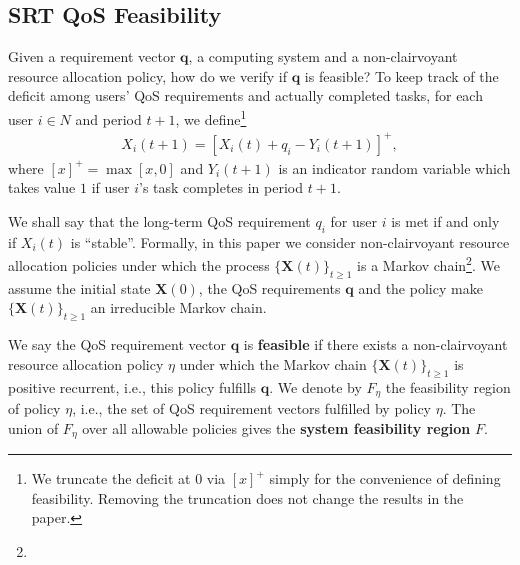 \documentclass[prodmode,acmtompecs]{acmsmall}
\newcommand{\reqvec}{\mathbf{q}}
\newcommand{\reqscalar}{q}
\newcommand{\feasibilityRegion}{F}
\newcommand{\fullUserSet}{N}
\newcommand{\myComments}[1]{}
\newif\ifinfocom
\newif\iftompecs
\newcommand{\infocomStart}{\ifinfocom \myComments{Infocom: }}
\newcommand{\tompecsStart}{\iftompecs \myComments{TOMPECS version: }}
\newcommand{\commentEnd}{\myComments{End}}
\begin{document}
\subsection{SRT QoS Feasibility}
Given a requirement vector $\reqvec$, a computing system and a non-clairvoyant resource allocation policy, how do we verify if $\reqvec$ is feasible?  
To keep track of the deficit among users' QoS requirements and actually completed tasks, for each user $i\in \fullUserSet$ and period $t+1$, we define\footnote{We truncate the deficit at $0$ via $[x]^+$ simply for the convenience of defining feasibility. Removing the truncation does not change the results in the paper. }
\begin{align}
\label{align_deficit}
X_i(t+1) = [X_i(t) + q_i - Y_i(t+1)]^+,
\end{align}
where $[x]^+ = \max[x, 0]$ and $Y_i(t+1)$ is an indicator random variable which takes value $1$ if user $i$'s task completes in period $t+1$. 
\infocomStart
The deficit vector $\mathbf{X}(t) = (X_1(t), X_2(t), \cdots, X_n(t))$ is a summary of the history of events up to period $t$. 
\commentEnd\fi
\tompecsStart
We let $\mathbf{X}(t) = (X_1(t), X_2(t), \cdots, X_n(t))$ denote the deficit vector. $\mathbf{X}(t)$ is a summary of the history of events up to period $t$. 
\commentEnd\fi

We shall say that the long-term QoS requirement $\reqscalar_i$ for user $i$ is met if and only if $X_i(t)$ is ``stable''. 
Formally, in this paper we consider non-clairvoyant resource allocation policies under which the process $\{\mathbf{X}(t)\}_{t\geq 1}$ is a Markov chain\footnote{
\infocomStart
All the results in this paper can be generalized to a broader range of non-clairvoyant policies and $\reqvec$'s with irrational values, see \cite{EXT}. 
\commentEnd\fi
\tompecsStart
All the results in this paper can be generalized to a broader range of non-clairvoyant resource allocation policies under which some variation of $\mathbf{X}(t)$ is a Markov chain. For example, if a resource allocation policy depends on the deficit vectors in the past two periods, then $\{(\mathbf{X}(t), \mathbf{X}(t+1))\}_{t\geq 1}$ is a Markov chain. For simplicity of explanation, we assume $\{ \mathbf{X}(t)\}_{t\geq 1}$ is a Markov chain.
\commentEnd\fi
}. 
We assume the initial state $\mathbf{X}(0)$, the QoS requirements $\reqvec$ and the policy make $\{\mathbf{X}(t)\}_{t\geq 1}$ an irreducible Markov chain. 

\begin{definition}
\label{defn_feasibility_pr}
We say the QoS requirement vector $\reqvec$ is {\bf feasible} if there exists a non-clairvoyant resource allocation policy $\eta$ under which the Markov chain $\{\mathbf{X}(t)\}_{t\geq 1}$ is positive recurrent, i.e., this policy fulfills $\reqvec$. 
We denote by $\feasibilityRegion_{\eta}$ the feasibility region of policy $\eta$, i.e., the set of QoS requirement vectors fulfilled by policy $\eta$. The union of $\feasibilityRegion_{\eta}$ over all allowable policies gives the {\bf system feasibility region} $\feasibilityRegion$. 
\end{definition}
\end{document}
